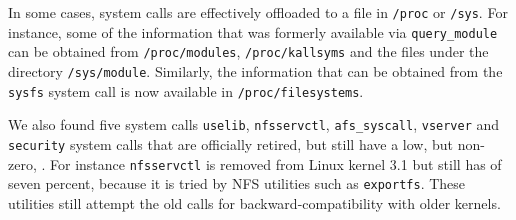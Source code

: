 


In some cases, system calls are effectively offloaded to a file in {\tt /proc} or {\tt /sys}.
For instance, some of the information that was formerly available via 
{\tt query\_module} can be obtained from {\tt /proc/modules}, {\tt /proc/kallsyms} 
and the files under the directory {\tt /sys/module}. Similarly, the information that can be obtained from the {\tt sysfs} system call
is now available in {\tt /proc/filesystems}.


We also found five system calls {\tt uselib}, {\tt nfsservctl}, {\tt afs\_syscall}, {\tt vserver} and {\tt security} system calls that are officially retired, but still have a low, but non-zero, \usagemetric{}. 
For instance {\tt nfsservctl} is removed from Linux kernel 3.1 but
still has \usagemetric{} of seven percent,  %
because it is tried by NFS utilities such as {\tt exportfs}.
These utilities still attempt the old calls for backward-compatibility with older kernels.









